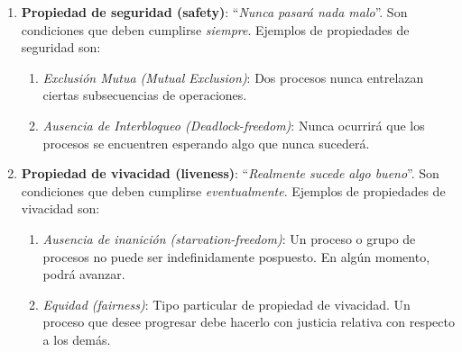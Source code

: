 \begin{enumerate}[label=P\arabic*]
    \item \textbf{Propiedad de seguridad (safety)}: ``\textit{Nunca pasará nada malo}''. Son condiciones que deben cumplirse \textit{siempre}. Ejemplos de propiedades de seguridad son:
    \begin{enumerate}[label=P1.\arabic*]
        \item \textit{Exclusión Mutua (Mutual Exclusion)}: Dos procesos nunca entrelazan ciertas subsecuencias de operaciones.
        \item \textit{Ausencia de Interbloqueo (Deadlock-freedom)}: Nunca ocurrirá que los procesos se encuentren esperando algo que nunca sucederá.
    \end{enumerate}
    \item \textbf{Propiedad de vivacidad (liveness)}: ``\textit{Realmente sucede algo bueno}''. Son condiciones que deben cumplirse \textit{eventualmente}. Ejemplos de propiedades de vivacidad son:
    \begin{enumerate}[label=P2.\arabic*]
        \item \textit{Ausencia de inanición (starvation-freedom)}: Un proceso o grupo de procesos no puede ser indefinidamente pospuesto. En algún momento, podrá avanzar.
        \item \textit{Equidad (fairness)}: Tipo particular de propiedad de vivacidad. Un proceso que desee progresar debe hacerlo con justicia relativa con respecto a los demás.
    \end{enumerate}
\end{enumerate}
